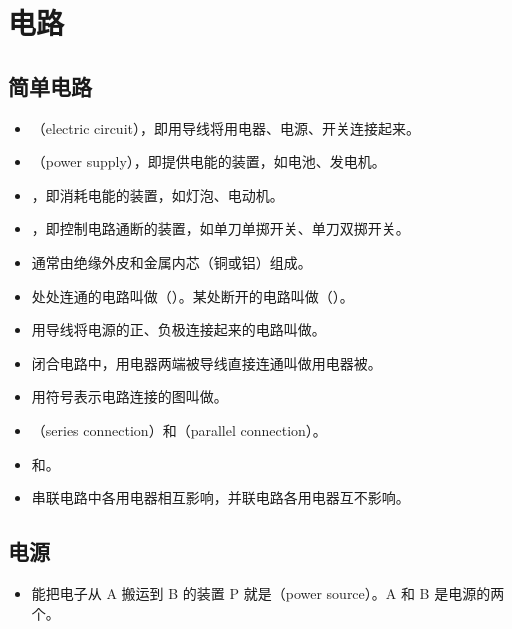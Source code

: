 \section{电路}

\subsection{简单电路}
\begin{itemize}
\item {}（electric circuit），即用导线将用电器、电源、开关连接起来。
\item {}（power supply），即提供电能的装置，如电池、发电机。
\item {}，即消耗电能的装置，如灯泡、电动机。
\item {}，即控制电路通断的装置，如单刀单掷开关、单刀双掷开关。
\item {}通常由绝缘外皮和金属内芯（铜或铝）组成。
\item 处处连通的电路叫做（）。某处断开的电路叫做（）。
\item {}用导线将电源的正、负极连接起来的电路叫做。
\item 闭合电路中，用电器两端被导线直接连通叫做用电器被。
\item 用符号表示电路连接的图叫做。
\item {}（series connection）和（parallel connection）。
\item {}和。
\item 串联电路中各用电器相互影响，并联电路各用电器互不影响。
\end{itemize}

\subsection{电源}
\begin{itemize}
\item 能把电子从 A 搬运到 B 的装置 P 就是（power source）。A 和 B 是电源的两个。
\end{itemize}

